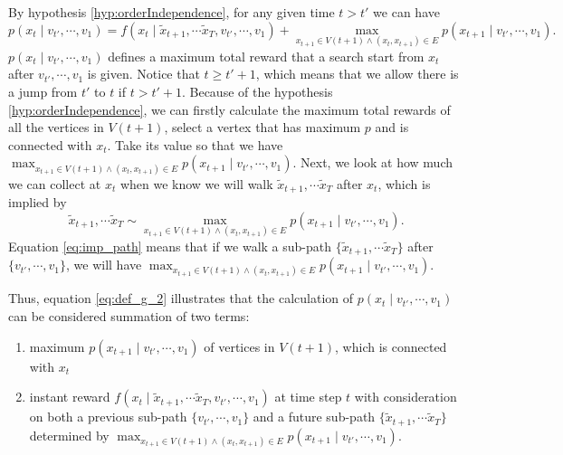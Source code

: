 \documentclass[12pt]{article}
\begin{document}
By hypothesis \ref{hyp:orderIndependence}, for any given time $ t > t' $ we can have 
\begin{equation}
\label{eq:def_g_2}
p( x_{t} \mid v_{t'} , \cdots , v_{1} ) = f( x_{t} \mid \tilde{x}_{t+1}, \cdots \tilde{x}_{T}, v_{t'} , \cdots , v_{1} ) +  \max_{x_{t+1} \in V(t+1) \land ( x_{t}, x_{t+1} ) \in E } p( x_{t+1} \mid v_{t'} , \cdots , v_{1} ).
\end{equation}
$ p( x_{t} \mid v_{t'} , \cdots , v_{1} ) $ defines a maximum total reward that a search start from $ x_{t} $ after $ v_{t'} , \cdots , v_{1} $ is given.
Notice that $ t \geq t'+1 $, which means that we allow there is a jump from $ t' $ to $ t $ if $ t > t' + 1 $.
Because of the hypothesis \ref{hyp:orderIndependence}, we can firstly calculate the maximum total rewards of all the vertices in $ V(t+1) $, select a vertex that has maximum $ p $ and is connected with $ x_{t} $.
Take its value so that we have $ \max_{x_{t+1} \in V(t+1) \land ( x_{t}, x_{t+1} ) \in E } p( x_{t+1} \mid v_{t'} , \cdots , v_{1} ) $. Next, we look at how much we can collect at $ x_{t} $ when we know we will walk $ \tilde{x}_{t+1}, \cdots \tilde{x}_{T} $ after $ x_{t} $, which is implied by 
\begin{equation}
\label{eq:imp_path}
\tilde{x}_{t+1}, \cdots \tilde{x}_{T} \sim \max_{x_{t+1} \in V(t+1) \land ( x_{t}, x_{t+1} ) \in E } p( x_{t+1} \mid v_{t'} , \cdots , v_{1} ).
\end{equation}
Equation \eqref{eq:imp_path} means that if we walk a sub-path $ \{ \tilde{x}_{t+1}, \cdots \tilde{x}_{T} \} $ after $ \{ v_{t'} , \cdots , v_{1} \} $, we will have 
$ \max_{x_{t+1} \in V(t+1) \land ( x_{t}, x_{t+1} ) \in E } p( x_{t+1} \mid v_{t'} , \cdots , v_{1} ) $.

Thus, equation \eqref{eq:def_g_2} illustrates that the calculation of $ p( x_{t} \mid v_{t'} , \cdots , v_{1} ) $ can be considered summation of two terms:
\begin{enumerate}
\item maximum $ p( x_{t+1} \mid v_{t'} , \cdots , v_{1} ) $ of vertices in $ V(t+1) $, which is connected with $ x_{t} $ 
\item instant reward $ f( x_{t} \mid \tilde{x}_{t+1}, \cdots \tilde{x}_{T}, v_{t'} , \cdots , v_{1} ) $ at time step $ t $ with consideration on both a previous sub-path $ \{ v_{t'} , \cdots , v_{1} \} $ and a future sub-path $ \{ \tilde{x}_{t+1}, \cdots \tilde{x}_{T} \} $ determined by $ \max_{x_{t+1} \in V(t+1) \land ( x_{t}, x_{t+1} ) \in E } p( x_{t+1} \mid v_{t'} , \cdots , v_{1} ) $.
\end{enumerate}
\end{document}
